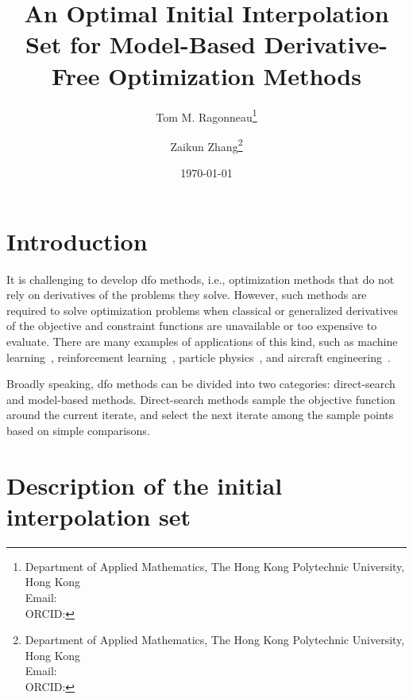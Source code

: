 \documentclass[draft]{article}
\title{An Optimal Initial Interpolation Set for Model-Based Derivative-Free Optimization Methods}
\author{
    Tom M. Ragonneau\thanks{
        Department of Applied Mathematics, The Hong Kong Polytechnic University, Hong Kong\\
        Email: \email{tom.ragonneau@polyu.edu.hk}\\
        ORCID: \orcid{0000-0003-2717-2876}
    } \and
    Zaikun Zhang\thanks{
        Department of Applied Mathematics, The Hong Kong Polytechnic University, Hong Kong\\
        Email: \email{zaikun.zhang@polyu.edu.hk}\\
        ORCID: \orcid{0000-0001-8934-8190}
    }
}
\date{\today}
\begin{document}
\maketitle

\begin{abstract}
\end{abstract}

\section{Introduction}

It is challenging to develop \gls{dfo} methods, i.e., optimization methods that do not rely on derivatives of the problems they solve.
However, such methods are required to solve optimization problems when classical or generalized derivatives of the objective and constraint functions are unavailable or too expensive to evaluate.
There are many examples of applications of this kind, such as machine learning~\cite{Ghanbari_Scheinberg_2017}, reinforcement learning~\cite{Qian_Yu_2021}, particle physics~\cite{Eldred_Etal_2022}, and aircraft engineering~\cite{Gazaix_Etal_2019}.

Broadly speaking, \gls{dfo} methods can be divided into two categories: direct-search~\cite{Kolda_Lewis_Torczon_2003} and model-based methods.
Direct-search methods sample the objective function around the current iterate, and select the next iterate among the sample points based on simple comparisons.

\section{Description of the initial interpolation set}





\listoffixmes
\end{document}
